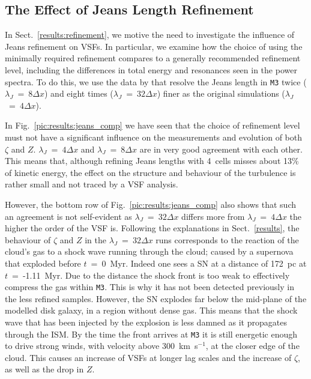\subsection{The Effect of Jeans Length Refinement}\label{discussion:refinement}

In Sect.~\ref{results:refinement}, we motive the need to investigate the influence of Jeans refinement on VSFs.
In particular, we examine how the choice of using the minimally required refinement compares to a generally recommended refinement level, including the differences in total energy and resonances seen in the power spectra. 
To do this, we use the data by  that resolve the Jeans length in \texttt{M3} twice ($\lambda_J$~=~$8\Delta{}x$) and eight times ($\lambda_J$~=~$32\Delta{}x$) finer as the original simulations ($\lambda_J$~=~$4\Delta{}x$).

In Fig.~\ref{pic:results:jeans_comp} we have seen that the choice of refinement level must not have a significant influence on the measurements and evolution of both $\zeta$ and $Z$. 
$\lambda_J$~=~$4\Delta{}x$ and $\lambda_J$~=~$8\Delta{}x$ are in very good agreement with each other.
This means that, although refining Jeans lengths with 4~cells misses about 13\% of kinetic energy, the effect on the structure and behaviour of the turbulence is rather small and not traced by a VSF analysis.

However, the bottom row of Fig.~\ref{pic:results:jeans_comp} also shows that such an agreement is not self-evident as $\lambda_J$~=~$32\Delta{}x$ differs more from $\lambda_J$~=~$4\Delta{}x$ the higher the order of the VSF is.
Following the explanations in Sect.~\ref{results}, the behaviour of $\zeta$ and $Z$ in the $\lambda_J$~=~$32\Delta{}x$ runs corresponds to the reaction of the cloud's gas to a shock wave running through the cloud; caused by a supernova that exploded before $t$~=~0~Myr. 
Indeed one sees a SN at a distance of 172~pc at $t$~=~-1.11~Myr. 
Due to the distance the shock front is too weak to effectively compress the gas within \texttt{M3}.
This is why it has not been detected previously in the less refined samples.
However, the SN explodes far below the mid-plane of the modelled disk galaxy, in a region without dense gas.
This means that the shock wave that has been injected by the explosion is less damned as it propagates through the ISM. 
By the time the front arrives at \texttt{M3} it is still energetic enough to drive strong winds, with velocity above 300~km~s$^{-1}$, at the closer edge of the cloud. 
This causes an increase of VSFs at longer lag scales and the increase of $\zeta$, as well as the drop in $Z$.


